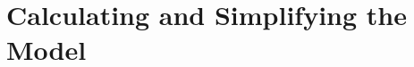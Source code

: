 \documentclass[../mcmpaper]{subfiles}
\begin{document}
	\section{Calculating and Simplifying the Model  }
	\lipsum[11]
\end{document}
